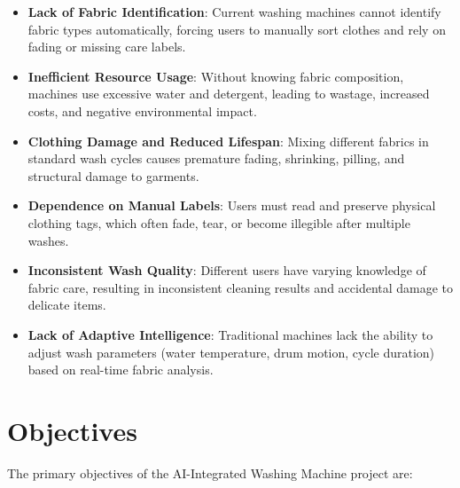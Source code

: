 \begin{itemize}
    \item \textbf{Lack of Fabric Identification}: Current washing machines cannot identify fabric types automatically, forcing users to manually sort clothes and rely on fading or missing care labels.
    \item \textbf{Inefficient Resource Usage}: Without knowing fabric composition, machines use excessive water and detergent, leading to wastage, increased costs, and negative environmental impact.
    \item \textbf{Clothing Damage and Reduced Lifespan}: Mixing different fabrics in standard wash cycles causes premature fading, shrinking, pilling, and structural damage to garments.
    \item \textbf{Dependence on Manual Labels}: Users must read and preserve physical clothing tags, which often fade, tear, or become illegible after multiple washes.
    \item \textbf{Inconsistent Wash Quality}: Different users have varying knowledge of fabric care, resulting in inconsistent cleaning results and accidental damage to delicate items.
    \item \textbf{Lack of Adaptive Intelligence}: Traditional machines lack the ability to adjust wash parameters (water temperature, drum motion, cycle duration) based on real-time fabric analysis.
\end{itemize}

\section{Objectives}
The primary objectives of the AI-Integrated Washing Machine project are:

